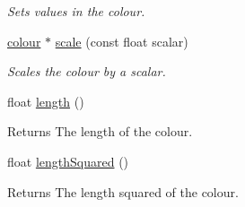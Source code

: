 \begin{DoxyCompactItemize}
\begin{DoxyCompactList}\small\item\em Sets values in the colour. \end{DoxyCompactList}\item 
\hyperlink{classflounder_1_1colour}{colour} $\ast$ \hyperlink{classflounder_1_1colour_ae60ded359183b2669720e40139e291a7}{scale} (const float scalar)
\begin{DoxyCompactList}\small\item\em Scales the colour by a scalar. \end{DoxyCompactList}\item 
\mbox{\label{classflounder_1_1colour_a0ead3d1f80571522cace5158a77b4184}} 
float \hyperlink{classflounder_1_1colour_a0ead3d1f80571522cace5158a77b4184}{length} ()
\begin{DoxyCompactList}\small\item\em \begin{DoxyReturn}{Returns}
The length of the colour. 
\end{DoxyReturn}
\end{DoxyCompactList}\item 
\mbox{\label{classflounder_1_1colour_aa3c91c3000ec427f64fa2162418ca6fe}} 
float \hyperlink{classflounder_1_1colour_aa3c91c3000ec427f64fa2162418ca6fe}{length\+Squared} ()
\begin{DoxyCompactList}\small\item\em \begin{DoxyReturn}{Returns}
The length squared of the colour. 
\end{DoxyReturn}
\end{DoxyCompactList}\end{DoxyCompactItemize}

